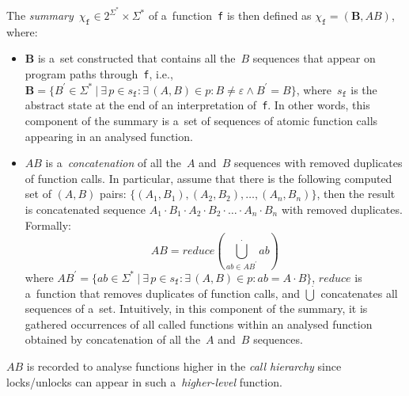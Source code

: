 The \emph{summary}~$ \chi_\mathtt{f} \in 2^{\Sigma^*} \times \Sigma^* $ of
a~function~\texttt{f} is then defined as $ \chi_\mathtt{f} = (\boldsymbol{B},
AB) $, where:
\begin{itemize}
    \item
        $ \boldsymbol{B} $ is a~set constructed that contains all the~$ B $
        sequences that appear on program paths through~\texttt{f}, i.e.,
        $ \boldsymbol{B} = \{B^\prime \in \Sigma^*\ |\ \exists\,p \in
        s_\mathtt{f} : \exists\,{(A, B)} \in p : B \neq \varepsilon \wedge
        B^\prime = B\} $, where~$ s_\mathtt{f} $ is the abstract state at the
        end of an interpretation of~\texttt{f}. In other words, this component
        of the summary is a~set of sequences of atomic function calls appearing
        in an analysed function.

    \item
        $ AB $ is a~\emph{concatenation} of all the~$ A $ and~$ B $
        sequences with removed duplicates of function calls. In particular,
        assume that there is the following computed set of ${ (A, B) }$
        pairs: $ \{{(A_1, B_1)}, {(A_2, B_2)}, \ldots, {(A_n, B_n)}\} $,
        then the result is concatenated sequence ${ A_1 \cdot B_1 \cdot A_2
        \cdot B_2 \cdot \ldots \cdot A_n \cdot B_n }$ with removed
        duplicates. Formally:
        $$
            AB = reduce(\bigcup\limits_{ab \in AB^\prime}^\cdot ab)
        $$
        where $ AB^\prime = \{ab \in \Sigma^*\ |\ \exists\,p \in s_\mathtt{f}
        : \exists\,(A, B) \in p: ab = {A \cdot B}\} $, $ reduce $ is a~function
        that removes duplicates of function calls, and $ \dot\bigcup $
        concatenates all sequences of a~set. Intuitively, in this component
        of the summary, it is gathered  occurrences of all called functions
        within an analysed function obtained by concatenation of all
        the~$ A $ and~$ B $ sequences.
\end{itemize}
$ AB $ is recorded to analyse functions higher in the \emph{call hierarchy}
since locks/unlocks can appear in such a~\emph{higher-level} function.


